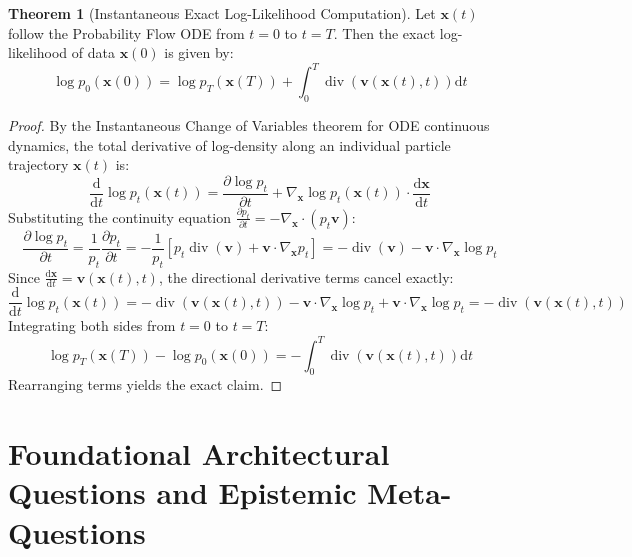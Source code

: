 \documentclass[11pt,a4paper]{article}
\theoremstyle{definition}
\newtheorem{theorem}{\textbf{Theorem}}[section]
\begin{document}
\begin{theorem}[Instantaneous Exact Log-Likelihood Computation]
Let $\mathbf{x}(t)$ follow the Probability Flow ODE from $t = 0$ to $t = T$. Then the exact log-likelihood of data $\mathbf{x}(0)$ is given by:
{\boldmath
\begin{equation}
\log p_0(\mathbf{x}(0)) = \log p_T(\mathbf{x}(T)) + \int_0^T \operatorname{div}\left( \mathbf{v}(\mathbf{x}(t), t) \right) \mathrm{d}t
\end{equation}
}
\end{theorem}

\begin{proof}
By the Instantaneous Change of Variables theorem for ODE continuous dynamics, the total derivative of log-density along an individual particle trajectory $\mathbf{x}(t)$ is:
{\boldmath
\begin{equation}
\frac{\mathrm{d}}{\mathrm{d}t} \log p_t(\mathbf{x}(t)) = \frac{\partial \log p_t}{\partial t} + \nabla_\mathbf{x} \log p_t(\mathbf{x}(t)) \cdot \frac{\mathrm{d}\mathbf{x}}{\mathrm{d}t}
\end{equation}
}
Substituting the continuity equation $\frac{\partial p_t}{\partial t} = -\nabla_\mathbf{x} \cdot (p_t \mathbf{v})$:
{\boldmath
\begin{equation}
\frac{\partial \log p_t}{\partial t} = \frac{1}{p_t}\frac{\partial p_t}{\partial t} = -\frac{1}{p_t}\left[ p_t \operatorname{div}(\mathbf{v}) + \mathbf{v} \cdot \nabla_\mathbf{x} p_t \right] = -\operatorname{div}(\mathbf{v}) - \mathbf{v} \cdot \nabla_\mathbf{x} \log p_t
\end{equation}
}
Since $\frac{\mathrm{d}\mathbf{x}}{\mathrm{d}t} = \mathbf{v}(\mathbf{x}(t), t)$, the directional derivative terms cancel exactly:
{\boldmath
\begin{equation}
\frac{\mathrm{d}}{\mathrm{d}t} \log p_t(\mathbf{x}(t)) = -\operatorname{div}(\mathbf{v}(\mathbf{x}(t), t)) - \mathbf{v} \cdot \nabla_\mathbf{x} \log p_t + \mathbf{v} \cdot \nabla_\mathbf{x} \log p_t = -\operatorname{div}(\mathbf{v}(\mathbf{x}(t), t))
\end{equation}
}
Integrating both sides from $t = 0$ to $t = T$:
{\boldmath
\begin{equation}
\log p_T(\mathbf{x}(T)) - \log p_0(\mathbf{x}(0)) = -\int_0^T \operatorname{div}(\mathbf{v}(\mathbf{x}(t), t)) \mathrm{d}t
\end{equation}
}
Rearranging terms yields the exact claim.
\end{proof}

\section{Foundational Architectural Questions and Epistemic Meta-Questions}
\end{document}
